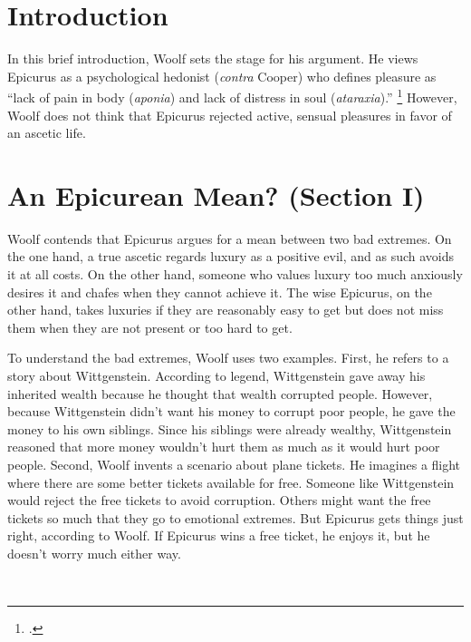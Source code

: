 \documentclass[12pt,letterpaper]{article}
\begin{document}
\raggedright


\pagestyle{notes}

\section*{Introduction}

In this brief introduction, Woolf sets the stage for his argument.
He views Epicurus as a psychological hedonist (\textit{contra} Cooper) who defines pleasure as ``lack of pain in body (\textit{aponia}) and lack of distress in soul (\textit{ataraxia}).''%
\footcite[][158]{pleasure-and-desire-woolf-2009}
However, Woolf does not think that Epicurus rejected active, sensual pleasures in favor of an ascetic life.

\section*{An Epicurean Mean? (Section I)}

Woolf contends that Epicurus argues for a mean between two bad extremes.
On the one hand, a true ascetic regards luxury as a positive evil, and as such avoids it at all costs.
On the other hand, someone who values luxury too much anxiously desires it and chafes when they cannot achieve it.
The wise Epicurus, on the other hand, takes luxuries if they are reasonably easy to get but does not miss them when they are not present or too hard to get.

To understand the bad extremes, Woolf uses two examples.
First, he refers to a story about Wittgenstein.
According to legend, Wittgenstein gave away his inherited wealth because he thought that wealth corrupted people.
However, because Wittgenstein didn't want his money to corrupt poor people, he gave the money to his own siblings.
Since his siblings were already wealthy, Wittgenstein reasoned that more money wouldn't hurt them as much as it would hurt poor people.
Second, Woolf invents a scenario about plane tickets.
He imagines a flight where there are some better tickets available for free.
Someone like Wittgenstein would reject the free tickets to avoid corruption.
Others might want the free tickets so much that they go to emotional extremes.
But Epicurus gets things just right, according to Woolf.
If Epicurus wins a free ticket, he enjoys it, but he doesn't worry much either way.

\newpage\
\pagestyle{references}
\printbibliography[title={Bibliography}]
\end{document}
